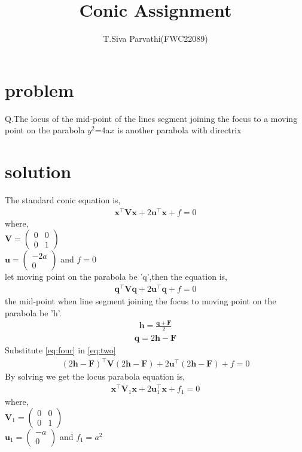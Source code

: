 \documentclass[journal,12pt,twocolumn]{IEEEtran}
\title{\mytitle}
\title{
Conic Assignment 
}
\author{T.Siva Parvathi(FWC22089)}
\newcommand{\myvec}[1]{\ensuremath{\begin{pmatrix}#1\end{pmatrix}}}
\let\vec\mathbf
\begin{document}
\maketitle
\tableofcontents
\bigskip


\section{\textbf{problem}}
Q.The locus of the mid-point of the lines segment joining the focus to a moving point on the parabola $y^2$=4a$x$ is another parabola with directrix

\section{\textbf{solution}}
The standard conic equation is,\\
\begin{align}
\label{eq:one}
\vec{x}^\top\vec{Vx}+2\vec{u}^\top\vec{x}+f=0
\end{align} 
 where,\\
$\vec{V}=\myvec{0&0 \\0&1}$\\ $\vec{u}=\myvec{-2a\\0}$ and $f=0$ \\
let moving point on the parabola be 'q',then the equation is,
\begin{align}
\label{eq:two}
\vec{q}^\top\vec{Vq}+2\vec{u}^\top\vec{q}+f=0
\end{align}
the mid-point when line segment joining the focus to moving point on the parabola be 'h'.
\begin{align}
\label{eq:three}
\vec{h}=\frac{\vec{q+F}}{2}
\end{align}
\begin{align}
\label{eq:four}
\vec{q}=2\vec{h}-\vec{F}
\end{align}
Substitute \eqref{eq:four} in \eqref{eq:two}\\
\begin{align}
\label{eq:five}
(2\vec{h}-\vec{F})^\top\vec{V}(2\vec{h}-\vec{F})+2\vec{u}^\top(2\vec{h}-\vec{F})+f=0
\end{align}
By solving we get the locus parabola equation is, \\
\begin{align}
\label{eq:six}
\vec{x}^\top\vec{V}_{1}\vec{x}+2\vec{u}_{1}^\top\vec{x}+f_1=0
\end{align} 
where,\\
$\vec{V}_{1}=\myvec{0&0 \\0&1}$\\ $\vec{u}_{1}=\myvec{-a\\0}$ and $f_1=a^2$ \\
\end{document}
